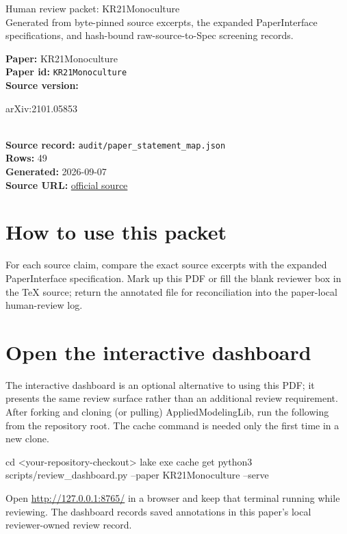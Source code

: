 \documentclass[10pt]{article}
\begin{document}
\fontsize{9}{10}\selectfont

\begin{center}
{\LARGE Human review packet: KR21Monoculture}\\[0.35em]
\small Generated from byte-pinned source excerpts, the expanded PaperInterface
specifications, and hash-bound raw-source-to-Spec screening records.
\end{center}

\noindent\textbf{Paper:} KR21Monoculture\\
\textbf{Paper id:} \texttt{KR21Monoculture}\\
\textbf{Source version:} \parbox[t]{0.76\linewidth}{\raggedright arXiv:2101.05853}\\
\textbf{Source record:} \texttt{audit/paper\_statement\_map.json}\\
\textbf{Rows:} 49\\
\textbf{Generated:} 2026-09-07\\
\textbf{Source URL:} \href{https://arxiv.org/abs/2101.05853}{official source}





\section*{How to use this packet}
For each source claim, compare the exact source excerpts with the expanded
PaperInterface specification. Mark up this PDF or fill the blank reviewer box in the TeX source;
return the annotated file for reconciliation into the paper-local human-review
log.

\section*{Open the interactive dashboard}
The interactive dashboard is an optional alternative to using this PDF; it
presents the same review surface rather than an additional review requirement.
After forking and cloning (or pulling) AppliedModelingLib, run the following from the
repository root. The cache command is needed only the first time in a new clone.
\begin{ReviewVerbatim}
cd <your-repository-checkout>
lake exe cache get
python3 scripts/review_dashboard.py --paper KR21Monoculture --serve
\end{ReviewVerbatim}
Open \url{http://127.0.0.1:8765/} in a browser and keep that terminal running
while reviewing. The dashboard records saved annotations in this paper's local
reviewer-owned review record.
\end{document}
